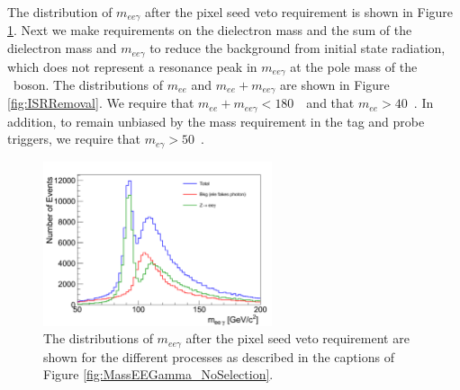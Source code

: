 \documentclass{cmspaper}
\begin{document}
The distribution of $m_{ee\gamma}$ after the pixel seed veto requirement is shown in
Figure \ref{fig:MassEEGamma_AfterPixelVeto}. Next we make requirements on the 
dielectron mass and the sum of the dielectron mass and $m_{ee\gamma}$ to reduce
the background from initial state radiation, which does not represent a resonance peak
in $m_{ee\gamma}$ at the pole mass of the \Z\ boson. The distributions of $m_{ee}$
and $m_{ee} + m_{ee\gamma}$ are shown in Figure \ref{fig:ISRRemoval}. We require that
$m_{ee} + m_{ee\gamma} < 180$~\GeV\ and that $m_{ee} > 40$~\GeV. In addition,
to remain unbiased by the mass requirement in the tag and probe triggers, we require that
$m_{e\gamma} > 50$~\GeV.

\begin{figure}[htb]
  \begin{center}
    \includegraphics[width=0.6\textwidth]{figures/MassEEGamma_AfterPixelVeto.pdf}
    \caption{The distributions of $m_{ee\gamma}$ after the pixel seed veto requirement
      are shown for the different processes
      as described in the captions of Figure \ref{fig:MassEEGamma_NoSelection}.       
    }
    \label{fig:MassEEGamma_AfterPixelVeto}
  \end{center}
\end{figure}
\end{document}
